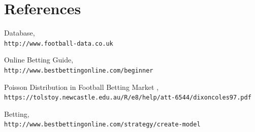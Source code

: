 \documentclass[12pt]{article}
\begin{document}
\section{References}
\begin{thebibliography}{} 
Database,
\\\texttt{http://www.football-data.co.uk}

Online Betting Guide,
\\\texttt{http://www.bestbettingonline.com/beginner}

Poisson Distribution in Football Betting Market  ,
\\\texttt{https://tolstoy.newcastle.edu.au/R/e8/help/att-6544/dixoncoles97.pdf}

Betting,
\\\texttt{http://www.bestbettingonline.com/strategy/create-model}

\end{thebibliography}
\end{document}
